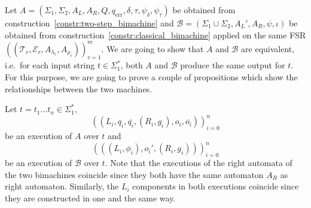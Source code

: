 \documentclass{article}
\begin{document}
	Let $A = (\Sigma_1, \Sigma_2, A_L, A_R, Q, q_\mathrm{err}, \delta, \tau, \psi_\delta, \psi_\tau)$ be obtained from construction~\ref{constr:two-step_bimachine}
	and $\mathcal{B} = (\Sigma_1\cup\Sigma_2, A_L', A_R, \psi, \iota)$ be obtained from construction~\ref{constr:classical_bimachine} applied on the same FSR $((\mathcal{T}_r, \mathcal{E}_r, A_{\lambda_r}, A_{\rho_r}))_{r=1}^m$.
	We are going to show that $A$ and $\mathcal{B}$ are equivalent, i.e.\ for each input string $t\in \Sigma_1^*$, both $A$ and $\mathcal{B}$ produce the same output for $t$.
	For this purpose, we are going to prove a couple of propositions which show the relationships between the two machines.
	
	Let $t=t_1\ldots t_n\in \Sigma_1^*$,
	\[ ((L_i, q_i, \overline{q_i}, (R_i, g_i), o_i, \overline{o_i}))_{i=0}^n \]
	be an execution of $A$ over $t$ and 
	\[ (((L_i, \phi_i), o_i', (R_i, g_i)))_{i=0}^n \]
	be an execution of $\mathcal{B}$ over $t$.
	Note that the executions of the right automata of the two bimachines coincide since they both have the same automaton $A_R$ as right automaton. Similarly, the $L_i$ components in both executions coincide since they are constructed in one and the same way.
	
\end{document}
